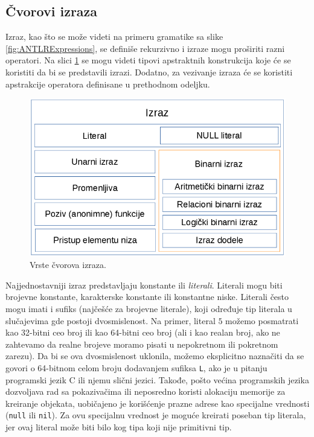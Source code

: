 \subsection{Čvorovi izraza}
\label{subsec:MyASTExpressionNodes}

Izraz, kao što se može videti na primeru gramatike sa slike \ref{fig:ANTLRExpressions}, se definiše rekurzivno i izraze mogu proširiti razni operatori. Na slici \ref{fig:ExpressionNodes} se mogu videti tipovi apstraktnih konstrukcija koje će se koristiti da bi se predstavili izrazi. Dodatno, za vezivanje izraza će se koristiti apstrakcije operatora definisane u prethodnom odeljku.

\begin{figure}[h!]
\centering
\includegraphics[scale=0.5]{images/expression_nodes.png}
\caption{Vrste čvorova izraza.}
\label{fig:ExpressionNodes}
\end{figure}

Najjednostavniji izraz predstavljaju konstante ili \emph{literali}. Literali mogu biti brojevne konstante, karakterske konstante ili konstantne niske. Literali često mogu imati i sufiks (najčešće za brojevne literale), koji određuje tip literala u slučajevima gde postoji dvosmislenost. Na primer, literal $5$ možemo posmatrati kao 32-bitni ceo broj ili kao 64-bitni ceo broj (ali i kao realan broj, ako ne zahtevamo da realne brojeve moramo pisati u nepokretnom ili pokretnom zarezu). Da bi se ova dvosmislenost uklonila, možemo eksplicitno naznačiti da se govori o 64-bitnom celom broju dodavanjem sufiksa \texttt{L}, ako je u pitanju programski jezik C ili njemu slični jezici. Takođe, pošto većina programskih jezika dozvoljava rad sa pokazivačima ili neposredno koristi alokaciju memorije za kreiranje objekata, uobičajeno je korišćenje prazne adrese kao specijalne vrednosti (\texttt{null} ili \texttt{nil}). Za ovu specijalnu vrednost je moguće kreirati poseban tip literala, jer ovaj literal može biti bilo kog tipa koji nije primitivni tip.

